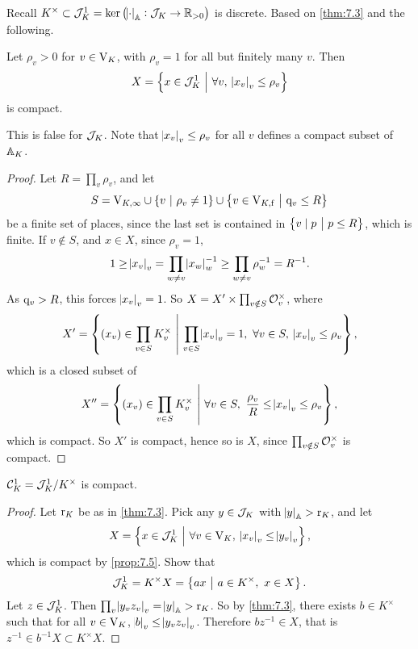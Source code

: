 Recall $ K^\times \subset \JJJ_K^1 = \ker \br{\abs{\cdot}_\AA : \JJJ_K \to \RR_{> 0}} $ is discrete. Based on \ref{thm:7.3} and the following.

\begin{proposition}
\label{prop:7.5}
Let $ \rho_v > 0 $ for $ v \in \V_K $, with $ \rho_v = 1 $ for all but finitely many $ v $. Then
$$ X = \cbr{x \in \JJJ_K^1 \st \forall v, \ \abs{x_v}_v \le \rho_v} $$
is compact.
\end{proposition}

This is false for $ \JJJ_K $. Note that $ \abs{x_v}_v \le \rho_v $ for all $ v $ defines a compact subset of $ \AA_K $.

\begin{proof}
Let $ R = \prod_v \rho_v $, and let
$$ S = \V_{K, \infty} \cup \cbr{v \st \rho_v \ne 1} \cup \cbr{v \in \V_{K, \f} \st \q_v \le R} $$
be a finite set of places, since the last set is contained in $ \cbr{v \mid p \st p \le R} $, which is finite. If $ v \notin S $, and $ x \in X $, since $ \rho_v = 1 $,
$$ 1 \ge \abs{x_v}_v = \prod_{w \ne v} \abs{x_w}_w^{-1} \ge \prod_{w \ne v} \rho_w^{-1} = R^{-1}. $$
As $ \q_v > R $, this forces $ \abs{x_v}_v = 1 $. So $ X = X' \times \prod_{v \notin S} \OOO_v^\times $, where
$$ X' = \cbr{\br{x_v} \in \prod_{v \in S} K_v^\times \st \prod_{v \in S} \abs{x_v}_v = 1, \ \forall v \in S, \ \abs{x_v}_v \le \rho_v}, $$
which is a closed subset of
$$ X'' = \cbr{\br{x_v} \in \prod_{v \in S} K_v^\times \st \forall v \in S, \ \dfrac{\rho_v}{R} \le \abs{x_v}_v \le \rho_v}, $$
which is compact. So $ X' $ is compact, hence so is $ X $, since $ \prod_{v \notin S} \OOO_v^\times $ is compact.
\end{proof}

\begin{theorem}
\label{thm:7.4}
$ \CCC_K^1 = \JJJ_K^1 / K^\times $ is compact.
\end{theorem}

\begin{proof}
Let $ \r_K $ be as in \ref{thm:7.3}. Pick any $ y \in \JJJ_K $ with $ \abs{y}_\AA > \r_K $, and let
$$ X = \cbr{x \in \JJJ_K^1 \st \forall v \in \V_K, \ \abs{x_v}_v \le \abs{y_v}_v}, $$
which is compact by \ref{prop:7.5}. Show that
$$ \JJJ_K^1 = K^\times X = \cbr{ax \st a \in K^\times, \ x \in X}. $$
Let $ z \in \JJJ_K^1 $. Then $ \prod_v \abs{y_vz_v}_v = \abs{y}_\AA > \r_K $. So by \ref{thm:7.3}, there exists $ b \in K^\times $ such that for all $ v \in \V_K $, $ \abs{b}_v \le \abs{y_vz_v}_v $. Therefore $ bz^{-1} \in X $, that is $ z^{-1} \in b^{-1}X \subset K^\times X $.
\end{proof}

